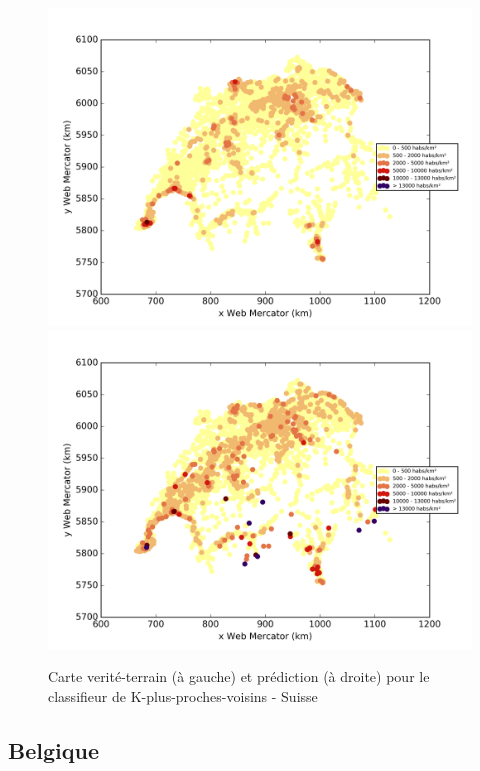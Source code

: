 \documentclass{book}
\begin{document}
\begin{figure}[H]
\centerline{
\includegraphics[scale=0.5]{../../data/Suisse/test/Nearest_Neighboors_Classification/Nearest_Neighboors_Classification/density_ground_truth.png}
\includegraphics[scale=0.5]{../../data/Suisse/test/Nearest_Neighboors_Classification/Nearest_Neighboors_Classification/density_classification.png}
}
\caption{Carte verité-terrain (à gauche) et prédiction (à droite) pour le classifieur de K-plus-proches-voisins - Suisse}
\label{nn_carte_suisse}
\end{figure}


\subsection{Belgique}
\end{document}
